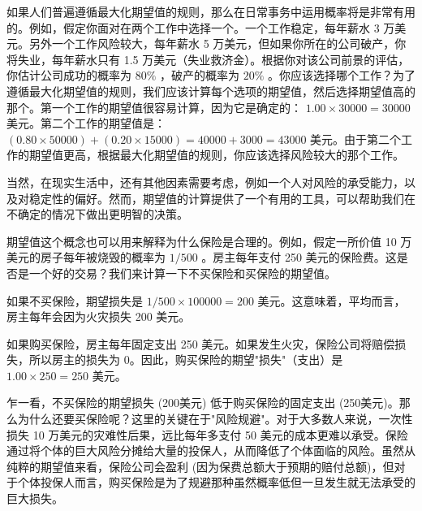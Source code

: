 如果人们普遍遵循最大化期望值的规则，那么在日常事务中运用概率将是非常有用的。例如，假定你面对在两个工作中选择一个。一个工作稳定，每年薪水 3 万美元。另外一个工作风险较大，每年薪水 5 万美元，但如果你所在的公司破产，你将失业，每年薪水只有 1.5 万美元（失业救济金）。根据你对该公司前景的评估，你估计公司成功的概率为 $80\%$ ，破产的概率为 $20\%$ 。你应该选择哪个工作？为了遵循最大化期望值的规则，我们应该计算每个选项的期望值，然后选择期望值高的那个。第一个工作的期望值很容易计算，因为它是确定的： $1.00 \times 30000=30000$ 美元。第二个工作的期望值是： $(0.80 \times 50000)+(0.20 \times 15000)=40000+3000=43000$ 美元。由于第二个工作的期望值更高，根据最大化期望值的规则，你应该选择风险较大的那个工作。

当然，在现实生活中，还有其他因素需要考虑，例如一个人对风险的承受能力，以及对稳定性的偏好。然而，期望值的计算提供了一个有用的工具，可以帮助我们在不确定的情况下做出更明智的决策。

期望值这个概念也可以用来解释为什么保险是合理的。例如，假定一所价值 10 万美元的房子每年被烧毁的概率为 $1 / 500$ 。房主每年支付 250 美元的保险费。这是否是一个好的交易？我们来计算一下不买保险和买保险的期望值。

如果不买保险，期望损失是 $1 / 500 \times 100000 = 200$ 美元。这意味着，平均而言，房主每年会因为火灾损失 200 美元。

如果购买保险，房主每年固定支出 250 美元。如果发生火灾，保险公司将赔偿损失，所以房主的损失为 0。因此，购买保险的期望"损失"（支出）是 $1.00 \times 250 = 250$ 美元。

乍一看，不买保险的期望损失 (200美元) 低于购买保险的固定支出 (250美元)。那么为什么还要买保险呢？这里的关键在于"风险规避"。对于大多数人来说，一次性损失 10 万美元的灾难性后果，远比每年多支付 50 美元的成本更难以承受。保险通过将个体的巨大风险分摊给大量的投保人，从而降低了个体面临的风险。虽然从纯粹的期望值来看，保险公司会盈利 (因为保费总额大于预期的赔付总额)，但对于个体投保人而言，购买保险是为了规避那种虽然概率低但一旦发生就无法承受的巨大损失。 
